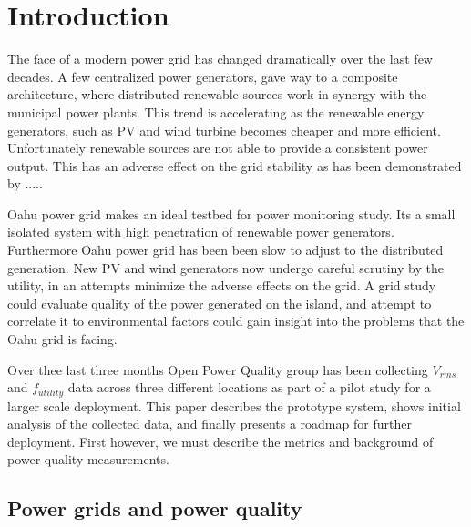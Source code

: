
\section{Introduction}

	The face of a modern power grid has changed dramatically over the last
few decades. A few centralized power generators, gave way to a composite architecture,
where distributed renewable sources work in synergy with the municipal power plants.
This trend is accelerating as the renewable energy generators, such as PV and wind 
turbine becomes cheaper and more efficient. Unfortunately renewable sources are not
able to provide a consistent power output. This has an adverse effect on the grid
stability as has been demonstrated by ..... 

	Oahu power grid makes an ideal testbed for power monitoring study. Its a small isolated system
with high penetration of renewable power generators. Furthermore Oahu power grid
has been been slow to adjust to the distributed generation. New PV and wind generators
now undergo careful scrutiny by the utility, in an attempts minimize the adverse effects 
on the grid. A grid study could evaluate quality of the power generated on the island,
and attempt to correlate it to environmental factors could gain insight into the problems 
that the Oahu grid is facing.

	Over thee last three months Open Power Quality group has been collecting $V_{rms}$ and
$f_{utility}$ data across three different locations as part of a pilot study for a larger scale deployment.
This paper describes the prototype system, shows initial analysis of the collected data, and finally presents a roadmap for further deployment.
First however, we must describe the metrics and background of power quality measurements.
\subsection{Power grids and power quality}

